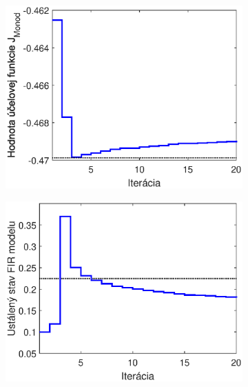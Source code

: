 \begin{figure}
	\centering
	\begin{subfigure}[b]{0.49\textwidth}
		\centering
		\includegraphics[width=\linewidth]{images/hybrid_bio_costFun}
		\caption{}
		\label{fig:hybrid_bio_costFun}
	\end{subfigure}
	\hfill
	\begin{subfigure}[b]{0.49\textwidth}
		\centering
		\includegraphics[width=\linewidth]{images/hybrid_bio_ss}
		\caption{}
		\label{fig:hybrid_bio_ss}
	\end{subfigure}
	\bigskip
	\begin{subfigure}[b]{0.49\textwidth}
		\centering

\end{subfigure}
\end{figure}
